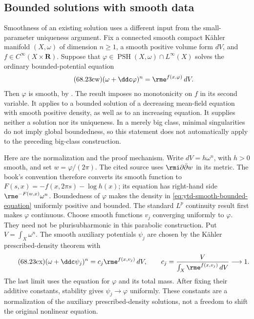 \subsection{Bounded solutions with smooth data}
\label{sec:ytd-smooth-bounded-regularity}

Smoothness of an existing solution uses a different input from the
small-parameter uniqueness argument. Fix a connected smooth compact
K\"ahler manifold $(X,\omega)$ of dimension $n\geq1$, a smooth
positive volume form $dV$, and $f\in C^\infty(X\times\mathbf R)$.
Suppose that $\varphi\in\operatorname{PSH}(X,\omega)\cap L^\infty(X)$
solves the ordinary bounded-potential equation
\[
\tag{68.23cw}\label{eq:ytd-smooth-bounded-equation}
 (\omega+\ddc\varphi)^n=\rme^{f(x,\varphi)}\,dV.
\]
Then $\varphi$ is smooth, by
\cite[Theorem~1.1]{SzekelyhidiTosatti11RegularityV2}.
The result imposes no monotonicity on $f$ in its second variable.
It applies to a bounded solution of a decreasing mean-field equation
with smooth positive density, as well as to an increasing equation.
It supplies neither a solution nor its uniqueness. In a merely big
class, minimal singularities do not imply global boundedness, so this
statement does not automatically apply to the preceding big-class
construction.

Here are the normalization and the proof mechanism. Write
$dV=h\omega^n$, with $h>0$ smooth, and set $w=\varphi/(2\pi)$.
The cited source uses $\rmi\partial\bar\partial w$ in its metric.
The book's convention therefore converts its smooth function to
$F(s,x)=-f(x,2\pi s)-\log h(x)$; its equation has right-hand side
$\rme^{-F(w,x)}\omega^n$.
Boundedness of $\varphi$ makes the density in
\eqref{eq:ytd-smooth-bounded-equation} uniformly positive and bounded.
The standard $L^p$ continuity result first makes $\varphi$ continuous.
Choose smooth functions $v_j$ converging uniformly to $\varphi$.
They need not be plurisubharmonic in this parabolic construction.
Put $V=\int_X\omega^n$. The smooth auxiliary potentials $\psi_j$
are chosen by the K\"ahler prescribed-density theorem with
\[
\tag{68.23cx}\label{eq:ytd-smooth-bounded-approximation}
 (\omega+\ddc\psi_j)^n
       =c_j\rme^{f(x,v_j)}\,dV,
 \qquad
 c_j=\frac{V}{\int_X\rme^{f(x,v_j)}\,dV}\longrightarrow1.
\]
The last limit uses the equation for $\varphi$ and its total mass.
After fixing their additive constants, stability gives
$\psi_j\to\varphi$ uniformly. These constants are a normalization
of the auxiliary prescribed-density solutions, not a freedom to
shift the original nonlinear equation.

